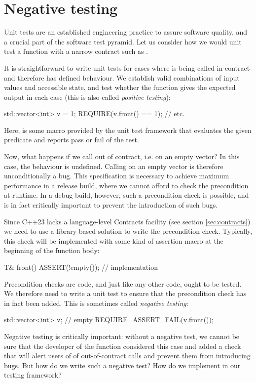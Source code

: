 \section{Negative testing}
\label{sec:negativetest}

Unit tests are an established engineering practice to assure software quality, and a crucial part of the software test pyramid. Let us consider how we would unit test a function with a narrow contract such as .

It is straightforward to write unit tests for cases where  is being called in-contract and therefore has defined behaviour. We establish valid combinations of input values and accessible state, and test whether the function gives the expected output in each case (this is also called \emph{positive testing}):
\begin{codeblock}
std::vector<int> v = {1};
REQUIRE(v.front() == 1);
// etc.
\end{codeblock}
Here,  is some macro provided by the unit test framework that evaluates the given predicate and reports pass or fail of the test.

Now, what happens if we call  out of contract, i.e. on an empty vector? In this case, the behaviour is undefined. Calling  on an empty vector is therefore unconditionally a bug. This specification is necessary to achieve maximum performance in a release build, where we cannot afford to check the precondition at runtime. In a debug build, however, such a precondition check is possible, and is in fact critically important to prevent the introduction of such bugs.

Since C++23 lacks a language-level Contracts facility (see section \ref{sec:contracts}) we need to use a library-based solution to write the precondition check. Typically, this check will be implemented with some kind of assertion macro at the beginning of the function body:
\begin{codeblock}
T& front() {
  ASSERT(!empty());
  // implementation
}
\end{codeblock}


Precondition checks are code, and just like any other code, ought to be tested. We therefore need to write a unit test to ensure that the precondition check has in fact been added. This is sometimes called \emph{negative testing}:
\begin{codeblock}
std::vector<int> v;  // empty
REQUIRE_ASSERT_FAIL(v.front());
\end{codeblock}
Negative testing is critically important: without a negative test, we cannot be sure that the developer of the  function considered this case and added a check that will alert users of  of out-of-contract calls and prevent them from introducing bugs.
But how do we write such a negative test? How do we implement  in our testing framework?

